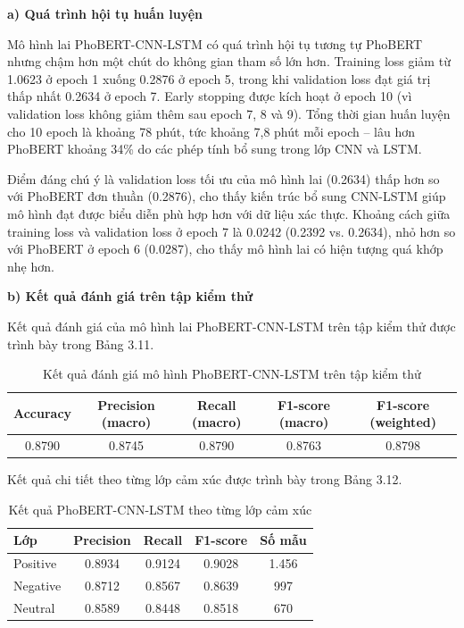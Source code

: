 \documentclass[14pt, a4paper]{report}
\begin{document}
\textbf{a) Quá trình hội tụ huấn luyện}


Mô hình lai PhoBERT-CNN-LSTM có quá trình hội tụ tương tự PhoBERT nhưng chậm hơn một chút do không gian tham số lớn hơn. Training loss giảm từ 1.0623 ở epoch 1 xuống 0.2876 ở epoch 5, trong khi validation loss đạt giá trị thấp nhất 0.2634 ở epoch 7. Early stopping được kích hoạt ở epoch 10 (vì validation loss không giảm thêm sau epoch 7, 8 và 9). Tổng thời gian huấn luyện cho 10 epoch là khoảng 78 phút, tức khoảng 7,8 phút mỗi epoch – lâu hơn PhoBERT khoảng 34\% do các phép tính bổ sung trong lớp CNN và LSTM.


Điểm đáng chú ý là validation loss tối ưu của mô hình lai (0.2634) thấp hơn so với PhoBERT đơn thuần (0.2876), cho thấy kiến trúc bổ sung CNN-LSTM giúp mô hình đạt được biểu diễn phù hợp hơn với dữ liệu xác thực. Khoảng cách giữa training loss và validation loss ở epoch 7 là 0.0242 (0.2392 vs. 0.2634), nhỏ hơn so với PhoBERT ở epoch 6 (0.0287), cho thấy mô hình lai có hiện tượng quá khớp nhẹ hơn.


\textbf{b) Kết quả đánh giá trên tập kiểm thử}


Kết quả đánh giá của mô hình lai PhoBERT-CNN-LSTM trên tập kiểm thử được trình bày trong Bảng 3.11.


\begin{table}[h]
\centering
\caption{Kết quả đánh giá mô hình PhoBERT-CNN-LSTM trên tập kiểm thử}
\begin{tabular}{|c|c|c|c|c|}
\hline
\textbf{Accuracy} & \textbf{Precision (macro)} & \textbf{Recall (macro)} & \textbf{F1-score (macro)} & \textbf{F1-score (weighted)} \\
\hline
0.8790 & 0.8745 & 0.8790 & 0.8763 & 0.8798 \\
\hline
\end{tabular}
\end{table}




Kết quả chi tiết theo từng lớp cảm xúc được trình bày trong Bảng 3.12.


\begin{table}[h]
\centering
\caption{Kết quả PhoBERT-CNN-LSTM theo từng lớp cảm xúc}
\begin{tabular}{|l|c|c|c|c|}
\hline
\textbf{Lớp} & \textbf{Precision} & \textbf{Recall} & \textbf{F1-score} & \textbf{Số mẫu} \\
\hline
Positive & 0.8934 & 0.9124 & 0.9028 & 1.456 \\
\hline
Negative & 0.8712 & 0.8567 & 0.8639 & 997 \\
\hline
Neutral & 0.8589 & 0.8448 & 0.8518 & 670 \\
\hline
\end{tabular}
\end{table}
\end{document}
